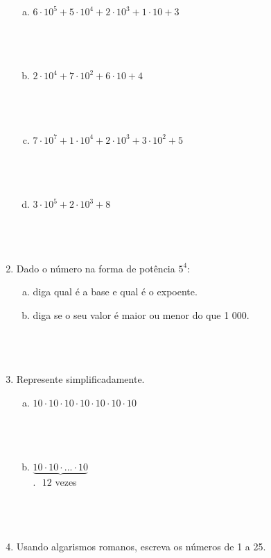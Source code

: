 \documentclass[a4paper,14pt]{article}
\begin{document}
\begin{multicols}{2}
\begin{enumerate}
			\begin{enumerate}[a)]
				\item $6 \cdot 10^5 + 5 \cdot 10^4 + 2 \cdot 10^3 + 1 \cdot 10 + 3$ \\\\\\\\
				\item $2 \cdot 10^4 + 7 \cdot 10^2 + 6 \cdot 10 + 4$ \\\\\\\\
				\item $7 \cdot 10^7 + 1 \cdot 10^4 + 2 \cdot 10^3 + 3 \cdot 10^2 + 5$ \\\\\\\\
				\item $3 \cdot 10^5 + 2 \cdot 10^3 + 8$ \\\\\\\\
			\end{enumerate}
			\item Dado o número na forma de potência $5^4$:
			\begin{enumerate}[a)]
				\item diga qual é a base e qual é o expoente.  \newpage
				\item diga se o seu valor é maior ou menor do que 1 000. \\\\\\\\
			\end{enumerate}
			\item Represente simplificadamente.
			\begin{enumerate}[a)]
				\item $10 \cdot 10 \cdot 10 \cdot 10 \cdot 10 \cdot 10 \cdot 10$ \\\\\\\\
				\item $\underbrace{10 \cdot 10 \cdot ... \cdot 10}$ \\ $.~~~12$ vezes \\\\\\\\
			\end{enumerate}
			\item Usando algarismos romanos, escreva os números de 1 a 25. \\\\\\\\\\\\\\\\\\\\

\end{enumerate}
\end{multicols}
\end{document}
